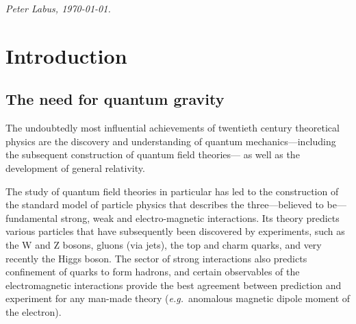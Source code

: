 \documentclass[11pt]{book}
\newcommand\eg{\textit{e.g.}\ }
\numberwithin{equation}{chapter}
\begin{document}
\begin{flushright}
  \textit{Peter Labus, \monthyeardate\today.}
\end{flushright}

\makeatletter
\@openrighttrue
\makeatother


\pagestyle{empty} %

\tableofcontents %

\pagestyle{fancy} %



\chapter*{Introduction}

\section*{The need for quantum gravity}


The undoubtedly most influential achievements of twentieth century theoretical physics
are the discovery and understanding of
quantum mechanics---including the subsequent construction of quantum field theories---%
as well as the development of general relativity.

The study of quantum field theories in particular has led to the construction
of the standard model of particle physics that describes the three---believed to be---fundamental
strong, weak and electro-magnetic interactions.
Its theory predicts various particles
that have subsequently been discovered by experiments,
such as the W and Z bosons, gluons (via jets), the top and charm quarks, and very recently the Higgs boson.
The sector of strong interactions also predicts confinement of quarks to form hadrons, and
certain observables of the electromagnetic interactions provide the best agreement between
prediction and experiment for any man-made theory (\eg anomalous magnetic dipole moment of the electron).
\end{document}
